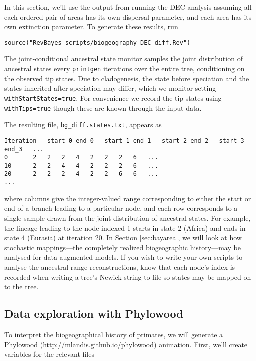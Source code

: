 In this section, we'll use the output from running the DEC analysis assuming all each ordered pair of areas has its own dispersal parameter, and each area has its own extinction parameter.
To generate these results, run
\begin{snugshade}
\begin{lstlisting}
source("RevBayes_scripts/biogeography_DEC_diff.Rev")
\end{lstlisting}
\end{snugshade}


The joint-conditional ancestral state monitor samples the joint distribution of ancestral states every {\tt printgen} iterations over the entire tree, conditioning on the observed tip states.
Due to cladogenesis, the state before speciation and the states inherited after speciation may differ, which we monitor setting {\tt withStartStates=true}.
For convenience we record the tip states using {\tt withTips=true} though these are known through the input data.

The resulting file, {\tt bg\_diff.states.txt}, appears as

\begin{framed}
\begin{lstlisting}
Iteration	start_0	end_0	start_1	end_1	start_2	end_2	start_3	end_3	...
0		2	2	2	4	2	2	2	6	...
10		2	2	4	4	2	2	2	6	...
20		2	2	2	4	2	2	6	6	...
...
\end{lstlisting}
\end{framed}

where columns give the integer-valued range corresponding to either the start or end of a branch leading to a particular node, and each row corresponds to a single sample drawn from the joint distribution of ancestral states.
For example, the lineage leading to the node indexed 1 starts in state 2 (Africa) and ends in state 4 (Eurasia) at iteration 20.
In Section \ref{sec:bayarea}, we will look at how stochastic mappings---the completely realized biogeographic history---may be analysed for data-augmented models.
If you wish to write your own scripts to analyse the ancestral range reconstructions, know that each node's index is recorded when writing a tree's Newick string to file so states may be mapped on to the tree.

\subsection{Data exploration with Phylowood}

To interpret the biogeographical history of primates, we will generate a Phylowood (\url{http://mlandis.github.io/phylowood}) animation.
First, we'll create variables for the relevant files


